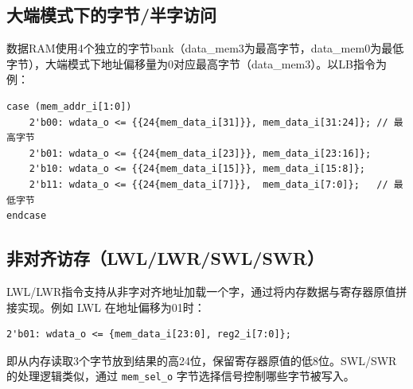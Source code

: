 \subsection{大端模式下的字节/半字访问}

数据RAM使用4个独立的字节bank（data\_mem3为最高字节，data\_mem0为最低字节），大端模式下地址偏移量为0对应最高字节（data\_mem3）。以LB指令为例：

\begin{lstlisting}[caption={LB指令在大端模式下的字节选择}]
case (mem_addr_i[1:0])
    2'b00: wdata_o <= {{24{mem_data_i[31]}}, mem_data_i[31:24]}; // 最高字节
    2'b01: wdata_o <= {{24{mem_data_i[23]}}, mem_data_i[23:16]};
    2'b10: wdata_o <= {{24{mem_data_i[15]}}, mem_data_i[15:8]};
    2'b11: wdata_o <= {{24{mem_data_i[7]}},  mem_data_i[7:0]};   // 最低字节
endcase
\end{lstlisting}

\subsection{非对齐访存（LWL/LWR/SWL/SWR）}

LWL/LWR指令支持从非字对齐地址加载一个字，通过将内存数据与寄存器原值拼接实现。例如 LWL 在地址偏移为01时：

\begin{lstlisting}[caption={LWL地址偏移01的拼接逻辑}]
2'b01: wdata_o <= {mem_data_i[23:0], reg2_i[7:0]};
\end{lstlisting}

即从内存读取3个字节放到结果的高24位，保留寄存器原值的低8位。SWL/SWR的处理逻辑类似，通过 \texttt{mem\_sel\_o} 字节选择信号控制哪些字节被写入。
